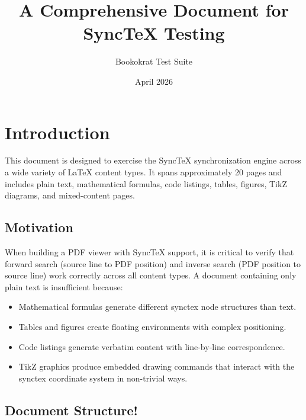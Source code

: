 \documentclass[11pt]{article}
\title{A Comprehensive Document for SyncTeX Testing}
\author{Bookokrat Test Suite}
\date{April 2026}
\begin{document}
\maketitle
\tableofcontents
\newpage

\section{Introduction}

This document is designed to exercise the SyncTeX synchronization engine across
a wide variety of LaTeX content types. It spans approximately 20 pages and
includes plain text, mathematical formulas, code listings, tables, figures,
TikZ diagrams, and mixed-content pages.

\subsection{Motivation}

When building a PDF viewer with SyncTeX support, it is critical to verify that
forward search (source line to PDF position) and inverse search (PDF position to
source line) work correctly across all content types. A document containing only
plain text is insufficient because:

\begin{itemize}
  \item Mathematical formulas generate different synctex node structures than text.
  \item Tables and figures create floating environments with complex positioning.
  \item Code listings generate verbatim content with line-by-line correspondence.
  \item TikZ graphics produce embedded drawing commands that interact with the
        synctex coordinate system in non-trivial ways.
\end{itemize}

\subsection{Document Structure!}
\end{document}
